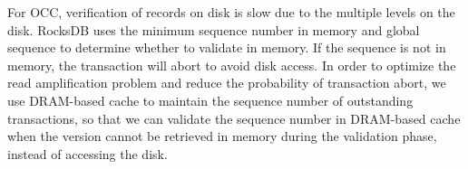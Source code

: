 For OCC, verification of records on disk is slow due to the multiple levels on the disk. RocksDB uses the minimum sequence number in memory and global sequence to determine whether to validate in memory. If the sequence is not in memory, the transaction will abort to avoid disk access. In order to optimize the read amplification problem and reduce the probability of transaction abort, we use DRAM-based cache to maintain the sequence number of outstanding transactions, so that we can validate the sequence number in DRAM-based cache when the version cannot be retrieved in memory during the validation phase, instead of accessing the disk.
